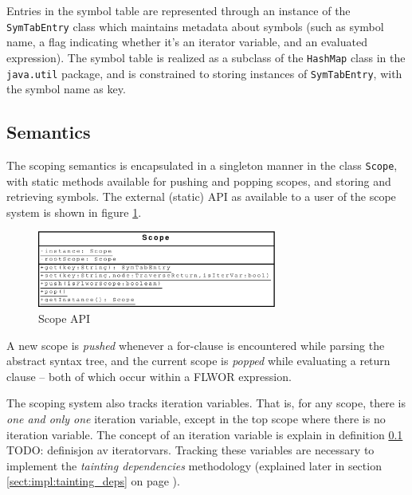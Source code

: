 Entries in the symbol table are represented through an instance of the
\texttt{SymTabEntry} class which maintains metadata about symbols (such as
symbol name, a flag indicating whether it's an iterator variable, and an
evaluated expression). The symbol table is realized as a subclass of the
\texttt{HashMap} class in the \texttt{java.util} package, and is constrained to
storing instances of \texttt{SymTabEntry}, with the symbol name as key.

\subsection{Semantics}
The scoping semantics is encapsulated in a singleton manner in the class
\texttt{Scope}, with static methods available for pushing and popping scopes,
and storing and retrieving symbols. The external (static) API as available to a
user of the scope system is shown in figure \ref{fig:impl:scope_uml}.

\begin{figure}[!htp]
\begin{center}
  \includegraphics[width=0.7\textwidth]{diagrams/scope_uml}
  \caption{Scope API}
  \label{fig:impl:scope_uml}
\end{center}
\end{figure}

A new scope is \textit{pushed} whenever a for-clause is encountered while
parsing the abstract syntax tree, and the current scope is \textit{popped} while
evaluating a return clause -- both of which occur within a FLWOR expression.

The scoping system also tracks iteration variables. That is, for any scope,
there is \textit{one and only one} iteration variable, except in the top scope
where there is no iteration variable. The concept of an iteration variable is
explain in definition \ref{} TODO: definisjon av iteratorvars. Tracking these
variables are necessary to implement the \textit{tainting dependencies}
methodology (explained later in section \ref{sect:impl:tainting_deps} on page
\pageref{sect:impl:tainting_deps}).
